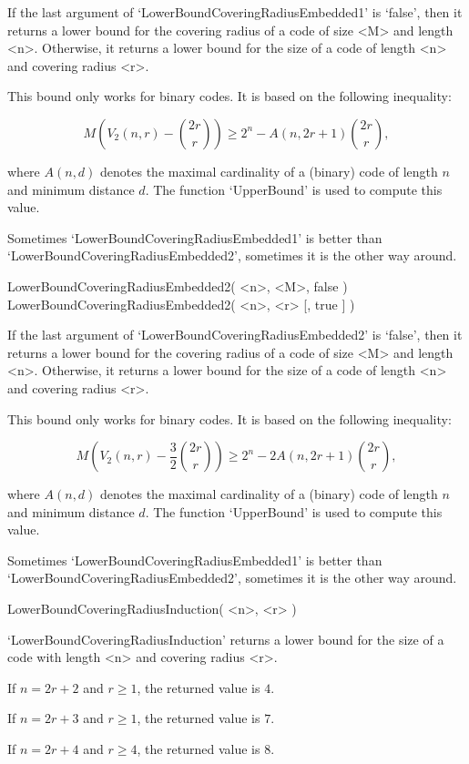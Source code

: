 If the last argument of `LowerBoundCoveringRadiusEmbedded1'  is  `false',
then it returns a lower bound for the covering radius of a code  of  size
<M> and length <n>. Otherwise, it returns a lower bound for the size of a
code of length <n> and covering radius <r>.

This bound only works for binary codes. It  is  based  on  the  following
inequality:

$$
M \left( V_2(n,r) - {2r \choose r} \right) \geq
2^n - A( n, 2r+1 ) {2r \choose r},
$$

where $A(n,d)$ denotes the maximal cardinality  of  a  (binary)  code  of
length $n$ and minimum distance $d$. The function `UpperBound' is used to
compute this value.

Sometimes    `LowerBoundCoveringRadiusEmbedded1'    is    better     than
`LowerBoundCoveringRadiusEmbedded2',  sometimes  it  is  the  other   way
around.

\>LowerBoundCoveringRadiusEmbedded2( <n>, <M>, false )
\>LowerBoundCoveringRadiusEmbedded2( <n>, <r> [, true ] )

If the last argument of `LowerBoundCoveringRadiusEmbedded2'  is  `false',
then it returns a lower bound for the covering radius of a code  of  size
<M> and length <n>. Otherwise, it returns a lower bound for the size of a
code of length <n> and covering radius <r>.

This bound only works for binary codes. It  is  based  on  the  following
inequality:

$$
M \left( V_2(n,r) - \frac{3}{2} {2r \choose r} \right) \geq
2^n - 2A( n, 2r+1 ) {2r \choose r},
$$

where $A(n,d)$ denotes the maximal cardinality  of  a  (binary)  code  of
length $n$ and minimum distance $d$. The function `UpperBound' is used to
compute this value.

Sometimes    `LowerBoundCoveringRadiusEmbedded1'    is    better     than
`LowerBoundCoveringRadiusEmbedded2',  sometimes  it  is  the  other   way
around.

\>LowerBoundCoveringRadiusInduction( <n>, <r> )

`LowerBoundCoveringRadiusInduction' returns a lower bound for the size of
a code with length <n> and covering radius <r>.

If $n = 2r+2$ and $r \geq 1$, the returned value is $4$.

If $n = 2r+3$ and $r \geq 1$, the returned value is $7$.

If $n = 2r+4$ and $r \geq 4$, the returned value is $8$.


